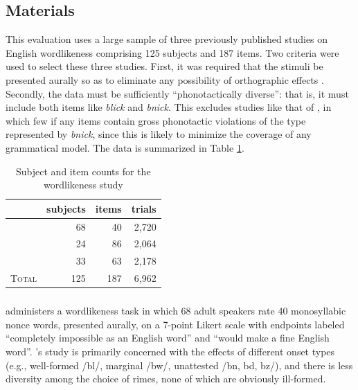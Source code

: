 \subsection{Materials}

This evaluation uses a large sample of three previously published studies on English wordlikeness comprising 125 subjects and 187 items. Two criteria were used to select these three studies. First, it was required that the stimuli be presented aurally so as to eliminate any possibility of orthographic effects \citep[e.g.,][]{Berent2001b,Berent2008b}. Secondly, the data must be sufficiently ``phonotactically diverse'': that is, it must include both items like \emph{blick} and \emph{bnick}. This excludes studies like that of \citet{Bailey2001}, in which few if any items contain gross phonotactic violations of the type represented by \emph{bnick}, since this is likely to minimize the coverage of any grammatical model. The data is summarized in Table \ref{counts}.

\begin{table}[t]
\centering
\begin{tabular}{l rrr}
\toprule
                           & subjects & items & trials \\
\midrule
\citeauthor{Albright2007}  & 68       & 40    & 2,720  \\
\citeauthor{Albright2003b} & 24       & 86    & 2,064  \\
\citeauthor{Scholes1966}   & 33       & 63    & 2,178  \\
\midrule
\textsc{Total}             & 125      & 187   & 6,962  \\
\bottomrule
\end{tabular}
\caption{Subject and item counts for the wordlikeness study}
\label{counts}
\end{table}

\subsubsection{\citealt{Albright2007}}

\citet{Albright2007} administers a wordlikeness task in which 68 adult speakers rate 40 monosyllabic nonce words, presented aurally, on a 7-point Likert scale with endpoints labeled  ``completely impossible as an English word'' and ``would make a fine English word''. \citeauthor{Albright2007}'s study is primarily concerned with the effects of different onset types (e.g., well-formed /bl/, marginal /bw/, unattested /bn, bd, bz/), and there is less diversity among the choice of rimes, none of which are obviously ill-formed.


